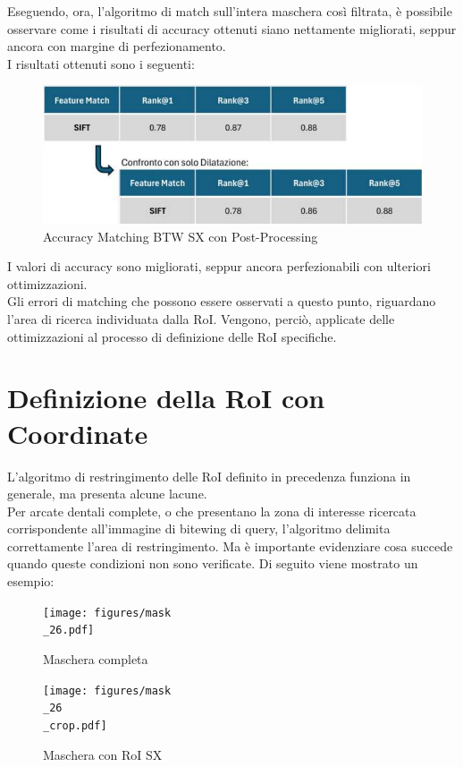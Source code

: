 \documentclass[12pt,a4paper,openright,twoside]{book}
\begin{document}
\begin{enumerate}
\end{enumerate}

Eseguendo, ora, l'algoritmo di match sull'intera maschera così filtrata, è possibile osservare come i risultati di accuracy ottenuti siano nettamente migliorati, seppur ancora con margine di perfezionamento. \\
I risultati ottenuti sono i seguenti:
\begin{figure}[H]
	\centering
	\includegraphics{figures/sx7_1.pdf}
    	\caption{Accuracy Matching BTW SX con Post-Processing}
	\label{fig:sx7}
\end{figure}
I valori di accuracy sono migliorati, seppur ancora perfezionabili con ulteriori ottimizzazioni. \\
Gli errori di matching che possono essere osservati a questo punto, riguardano l'area di ricerca individuata dalla RoI. Vengono, perciò, applicate delle ottimizzazioni al processo di definizione delle RoI specifiche.

\section{Definizione della RoI con Coordinate}
L'algoritmo di restringimento delle RoI definito in precedenza funziona in generale, ma presenta alcune lacune.\\
Per arcate dentali complete, o che presentano la zona di interesse ricercata corrispondente all'immagine di bitewing di query, l'algoritmo delimita correttamente l'area di restringimento. %
Ma è importante evidenziare cosa succede quando queste condizioni non sono verificate. Di seguito viene mostrato un esempio:
\begin{figure}[H]
    \centering
    \begin{minipage}{0.45\textwidth}
	\centering
    	\texttt{[image: figures/mask\\\_26.pdf]}
    	\caption{Maschera completa}
    	\label{lab:Maschera completa}
    \end{minipage}\hfill
    \begin{minipage}{0.45\textwidth}
    	\centering
    	\texttt{[image: figures/mask\\\_26\\\_crop.pdf]}
    	\caption{Maschera con RoI SX}
    	\label{lab:Maschera con RoI sx}
    \end{minipage}\hfill
\end{figure}
 
\end{document}
